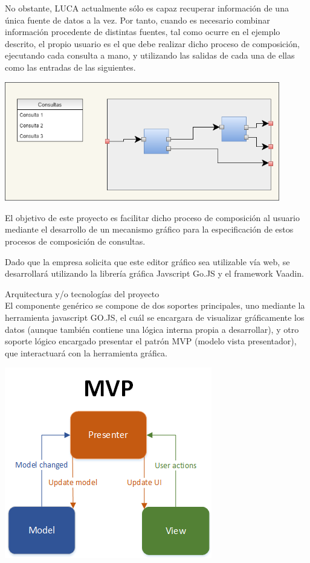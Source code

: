 \documentclass[a4paper,12pt]{article}
\begin{document}
	No obstante, LUCA actualmente sólo es capaz recuperar información de una única
	fuente de datos a la vez. Por tanto, cuando es necesario combinar
	información procedente de distintas fuentes, tal como ocurre en el ejemplo
	descrito, el propio usuario es el que debe realizar dicho
	proceso de composición, ejecutando cada consulta a mano, y utilizando las
	salidas de cada una de ellas como las entradas de las siguientes.
	
	
		\begin{center}
		\includegraphics[width=12cm]{images/ejemploDiagrama}\\
	\end{center}
	
	
	El objetivo de este proyecto es facilitar dicho proceso de composición al
	usuario mediante el desarrollo de un mecanismo gráfico para la especificación
	de estos procesos de composición de consultas.
	
	Dado que la empresa solicita que este editor gráfico sea utilizable vía web,
	se desarrollará utilizando la librería gráfica Javscript Go.JS y el framework
	Vaadin.
	
	\newpage
	{\Large Arquitectura y/o tecnologías del proyecto}\\
	
	El componente genérico se compone de dos soportes principales, uno mediante la herramienta javascript GO.JS, el cuál se encargara de visualizar gráficamente los datos (aunque también contiene una lógica interna propia a desarrollar), y otro soporte lógico encargado presentar el patrón MVP (modelo vista presentador), que interactuará con la herramienta gráfica.\\
	
	\begin{center}
		\includegraphics{images/mvp}\\
	\end{center}
	
\end{document}
